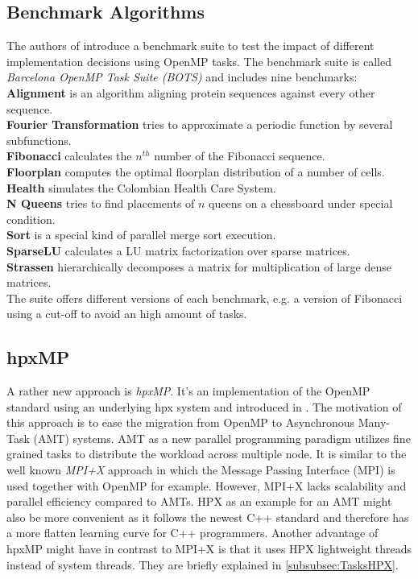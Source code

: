      
\subsection{Benchmark Algorithms}
\label{subsec:BOTS}
  The authors of \cite{Duran.2009} introduce a benchmark suite to test the impact of different implementation decisions using OpenMP tasks.
  The benchmark suite is called \textit{Barcelona OpenMP Task Suite (BOTS)} and includes nine benchmarks:\\
    \textbf{Alignment} is an algorithm aligning protein sequences against every other sequence.\\
    \textbf{Fourier Transformation} tries to approximate a periodic function by several subfunctions.\\
    \textbf{Fibonacci} calculates the \(n^{th}\) number of the Fibonacci sequence.\\
    \textbf{Floorplan} computes the optimal floorplan distribution of a number of cells.\\
    \textbf{Health} simulates the Colombian Health Care System.\\
    \textbf{N Queens} tries to find placements of \(n\) queens on a chessboard under special condition.\\
    \textbf{Sort} is a special kind of parallel merge sort execution.\\
    \textbf{SparseLU} calculates a LU matrix factorization over sparse matrices.\\
    \textbf{Strassen} hierarchically decomposes a matrix for multiplication of large dense matrices.\\
  The suite offers different versions of each benchmark, e.g. a version of Fibonacci using a cut-off to avoid an high amount of tasks.
 
 
\subsection{hpxMP}
  A rather new approach is \textit{hpxMP}.
  It's an implementation of the OpenMP standard using an underlying hpx system and introduced in \cite{hpxMP.2019}.
  The motivation of this approach is to ease the migration from OpenMP to Asynchronous Many-Task (AMT) systems.
  AMT as a new parallel programming paradigm utilizes fine grained tasks to distribute the workload across multiple node.
  It is similar to the well known \textit{MPI+X} approach in which the Message Passing Interface (MPI) is used together with OpenMP for example.
  However, MPI+X lacks scalability and parallel efficiency compared to AMTs.
  HPX as an example for an AMT might also be more convenient as it follows the newest C++ standard and therefore has a more flatten learning curve for C++ programmers.
  Another advantage of hpxMP might have in contrast to MPI+X is that it uses HPX lightweight threads instead of system threads.
  They are briefly explained in \ref{subsubsec:TasksHPX}.
  
